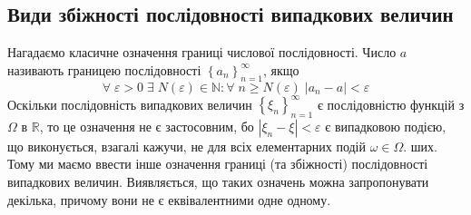 \subsection{Види збіжності послідовності випадкових величин}
Нагадаємо класичне означення границі числової послідовності. Число $a$ називають границею послідовності 
$\left\{ a_n\right\}_{n=1}^{\infty}$, якщо
$$ \forall \; \varepsilon > 0 \; \exists \; N(\varepsilon) \in \mathbb{N}: \forall \; n \geq N(\varepsilon) \; \left| a_n - a\right| < \varepsilon$$
Оскільки послідовність випадкових величин $\left\{ \xi_n\right\}_{n=1}^{\infty}$ є послідовністю функцій з $\Omega$ в $\mathbb{R}$, то це означення
не є застосовним, бо $\left| \xi_n - \xi\right| < \varepsilon$ є випадковою подією, що виконується, взагалі кажучи, не для всіх елементарних подій
$\omega \in \Omega$. ших. Тому ми маємо ввести інше означення границі (та збіжності) послідовності
випадкових величин. Виявляється, що таких означень можна запропонувати декілька, причому вони
не є еквівалентними одне одному.
\vspace{1em}
